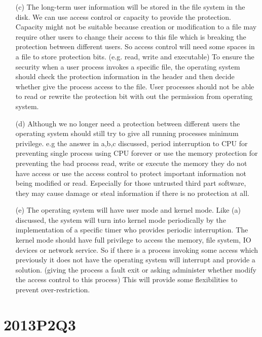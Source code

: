\documentclass[10pt,twoside,a4paper]{article}
\begin{document}
\begin{itemize}
\item[(c)]
The long-term user information will be stored in the file system in the disk. We can use access control or capacity to provide the protection. Capacity might not be suitable because creation or modification to a file may require other users to change their access to this file which is breaking the protection between different users. So access control will need some spaces in a file to store protection bits. (e.g. read, write and executable) To ensure the security when a user process invokes a specific file, the operating system should check the protection information in the header and then decide whether give the process access to the file.  User processes should not be able to read or rewrite the protection bit with out the permission from operating system.
\item[(d)]
Although we no longer need a protection between different users the operating system should still try to give all running processes minimum privilege. e.g the answer in a,b,c discussed, period interruption to CPU for preventing single process using CPU forever or use the memory protection for preventing the bad process read, write or execute the memory they do not have access or use the access control to protect important information not being modified or read. Especially for those untrusted third part software, they may cause damage or steal information if there is no protection at all.
\item[(e)]
The operating system will have user mode and kernel mode. Like (a) discussed, the system will turn into kernel mode periodically by the implementation of a specific timer who provides periodic interruption. The kernel mode should have full privilege to access the memory, file system, IO devices or network service. So if there is a process invoking some access which previously it does not have the operating system will interrupt and provide a solution. (giving the process a fault exit or asking administer whether modify the access control to this process) This will provide some flexibilities to prevent over-restriction.
\end{itemize}

\section{2013P2Q3}
\end{document}
